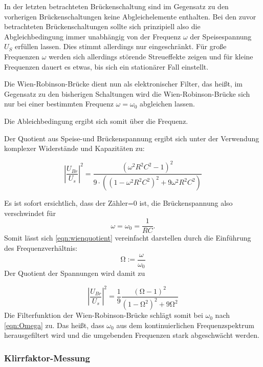 In der letzten betrachteten Brückenschaltung sind im Gegensatz zu den vorherigen Brückenschaltungen keine Abgleichelemente enthalten.
Bei den zuvor betrachteten Brückenschaltungen sollte sich prinzipiell also die Abgleichbedingung immer unabhängig von der Frequenz $\omega$ der Speisespannung $U_S$ erfüllen lassen. Dies stimmt allerdings nur eingeschränkt. Für große Frequenzen $\omega$ werden sich allerdings störende Streueffekte zeigen und für kleine Frequenzen dauert es etwas, bis sich ein stationärer Fall einstellt.

Die Wien-Robinson-Brücke dient nun als elektronischer Filter, das heißt, im Gegensatz zu den bisherigen Schaltungen wird die Wien-Robinson-Brücke sich nur bei einer bestimmten Frequenz $\omega=\omega_0$ abgleichen lassen.

Die Ableichbedingung ergibt sich somit über die Frequenz.

Der Quotient aus Speise-und Brückenspannung ergibt sich unter der Verwendung komplexer Widerstände und Kapazitäten zu:

\begin{equation}
\label{eqn:wienquotient}
\left|\frac{U_{Br}}{U_s}\right|^2= \frac{(\omega^2R^2C^2-1)^2}{9 \cdot ((1-\omega^2R^2C^2)^2+9\omega^2R^2C^2)}
\end{equation}

Es ist sofort ersichtlich, dass der Zähler=0 ist, die Brückenspannung also verschwindet für
\begin{equation}
  \label{eqn:Omega}
\omega=\omega_0=\frac{1}{RC} .
\end{equation}
Somit lässt sich \eqref{eqn:wienquotient} vereinfacht darstellen durch die Einführung des Frequenzverhältnis:
\begin{equation}
\si{\ohm}:=\frac{\omega}{\omega_0}
\end{equation}
Der Quotient der Spannungen wird damit zu

\begin{equation}
\label{eqn:wienquotienteinfach}
\left|\frac{U_{Br}}{U_s}\right|^2= \frac{1}{9}\frac{(\si{\ohm}-1)^2}{(1-\si{\ohm}^2)^2+9\si{\ohm}^2}
\end{equation}
Die Filterfunktion der Wien-Robinson-Brücke schlägt somit bei $\omega_0$ nach \eqref{eqn:Omega} zu. Das heißt, dass $\omega_0$ aus dem kontinuierlichen Frequenzspektrum herausgefiltert wird und die umgebenden Frequenzen stark abgeschwächt werden.
\subsubsection{Klirrfaktor-Messung}


